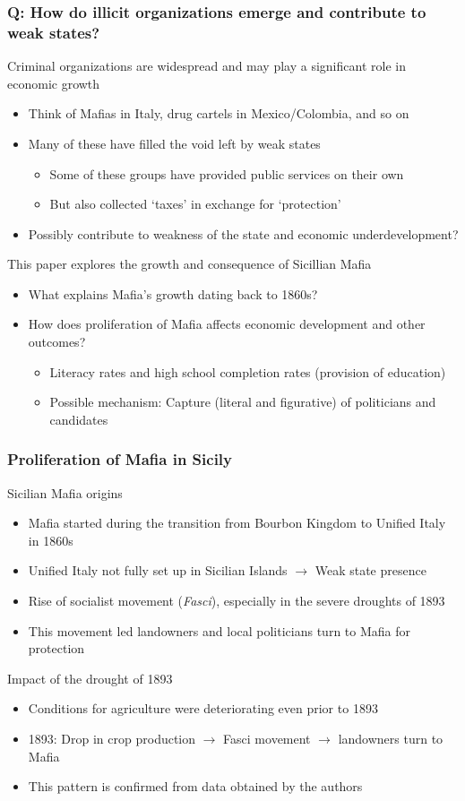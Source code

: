 \documentclass[aspectratio=169]{beamer}
\begin{document}
\begin{frame}
\frametitle{Q: How do illicit organizations emerge and contribute to weak states?}
Criminal organizations are widespread and may play a significant role in economic growth
\begin{itemize}\setlength\itemsep{3pt}
\item Think of Mafias in Italy, drug cartels in Mexico/Colombia, and so on
\item Many of these have filled the void left by weak states
\begin{itemize}\setlength\itemsep{3pt}
\item Some of these groups have provided public services on their own
\item But also collected `taxes' in exchange for `protection'
\end{itemize}
\item Possibly contribute to weakness of the state and economic underdevelopment?
\end{itemize}\medskip
This paper explores the growth and consequence of Sicillian Mafia
\begin{itemize}\setlength\itemsep{3pt}
\item What explains Mafia's growth dating back to 1860s?
\item How does proliferation of Mafia affects economic development and other outcomes?
\begin{itemize}\setlength\itemsep{3pt}
\item Literacy rates and high school completion rates (provision of education)
\item Possible mechanism: Capture (literal and figurative) of politicians and candidates
\end{itemize}
\end{itemize}
\end{frame}



\begin{frame}
\frametitle{Proliferation of Mafia in Sicily}
Sicilian Mafia origins
\begin{itemize}\setlength\itemsep{3pt}
\item Mafia started during the transition from Bourbon Kingdom to Unified Italy in 1860s
\item Unified Italy not fully set up in Sicilian Islands $\to$ Weak state presence
\item Rise of socialist movement (\textit{Fasci}), especially in the severe droughts of 1893
\item This movement led landowners and local politicians turn to Mafia for protection
\end{itemize}\medskip
Impact of the drought of 1893
\begin{itemize}\setlength\itemsep{3pt}
\item Conditions for agriculture were deteriorating even prior to 1893
\item 1893: Drop in crop production $\to$ Fasci movement $\to$ landowners turn to Mafia
\item This pattern is confirmed from data obtained by the authors
\end{itemize}
\end{frame}
\end{document}
